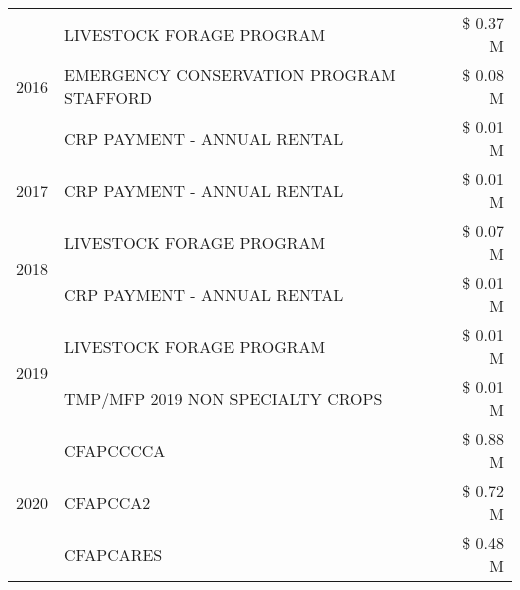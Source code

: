 \begin{tabular}{llr}
\cline{1-3}
\multirow[t]{3}{*}{2016} & LIVESTOCK FORAGE PROGRAM & \$ 0.37 M \\
 & EMERGENCY CONSERVATION PROGRAM STAFFORD & \$ 0.08 M \\
 & CRP PAYMENT - ANNUAL RENTAL & \$ 0.01 M \\
\cline{1-3}
2017 & CRP PAYMENT - ANNUAL RENTAL & \$ 0.01 M \\
\cline{1-3}
\multirow[t]{2}{*}{2018} & LIVESTOCK FORAGE PROGRAM & \$ 0.07 M \\
 & CRP PAYMENT - ANNUAL RENTAL & \$ 0.01 M \\
\cline{1-3}
\multirow[t]{2}{*}{2019} & LIVESTOCK FORAGE PROGRAM & \$ 0.01 M \\
 & TMP/MFP 2019 NON SPECIALTY CROPS & \$ 0.01 M \\
\cline{1-3}
\multirow[t]{3}{*}{2020} & CFAPCCCCA & \$ 0.88 M \\
 & CFAPCCA2 & \$ 0.72 M \\
 & CFAPCARES & \$ 0.48 M \\
\cline{1-3}
\bottomrule
\end{tabular}
